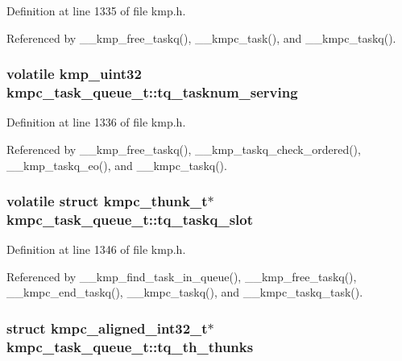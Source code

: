 Definition at line 1335 of file kmp.\-h.



Referenced by \-\_\-\-\_\-kmp\-\_\-free\-\_\-taskq(), \-\_\-\-\_\-kmpc\-\_\-task(), and \-\_\-\-\_\-kmpc\-\_\-taskq().

\hypertarget{structkmpc__task__queue__t_a628cd82e927fca521e942af89f006d59}{
\subsubsection[{tq\-\_\-tasknum\-\_\-serving}]{\setlength{\rightskip}{0pt plus 5cm}volatile kmp\-\_\-uint32 kmpc\-\_\-task\-\_\-queue\-\_\-t\-::tq\-\_\-tasknum\-\_\-serving}}\label{structkmpc__task__queue__t_a628cd82e927fca521e942af89f006d59}


Definition at line 1336 of file kmp.\-h.



Referenced by \-\_\-\-\_\-kmp\-\_\-free\-\_\-taskq(), \-\_\-\-\_\-kmp\-\_\-taskq\-\_\-check\-\_\-ordered(), \-\_\-\-\_\-kmp\-\_\-taskq\-\_\-eo(), and \-\_\-\-\_\-kmpc\-\_\-taskq().

\hypertarget{structkmpc__task__queue__t_a65ea724ea74e733bbae58fd1bb7511a6}{
\subsubsection[{tq\-\_\-taskq\-\_\-slot}]{\setlength{\rightskip}{0pt plus 5cm}volatile struct {\bf kmpc\-\_\-thunk\-\_\-t}$\ast$ kmpc\-\_\-task\-\_\-queue\-\_\-t\-::tq\-\_\-taskq\-\_\-slot}}\label{structkmpc__task__queue__t_a65ea724ea74e733bbae58fd1bb7511a6}


Definition at line 1346 of file kmp.\-h.



Referenced by \-\_\-\-\_\-kmp\-\_\-find\-\_\-task\-\_\-in\-\_\-queue(), \-\_\-\-\_\-kmp\-\_\-free\-\_\-taskq(), \-\_\-\-\_\-kmpc\-\_\-end\-\_\-taskq(), \-\_\-\-\_\-kmpc\-\_\-taskq(), and \-\_\-\-\_\-kmpc\-\_\-taskq\-\_\-task().

\hypertarget{structkmpc__task__queue__t_a71cbb7d720973aa2790fbafec688046a}{
\subsubsection[{tq\-\_\-th\-\_\-thunks}]{\setlength{\rightskip}{0pt plus 5cm}struct {\bf kmpc\-\_\-aligned\-\_\-int32\-\_\-t}$\ast$ kmpc\-\_\-task\-\_\-queue\-\_\-t\-::tq\-\_\-th\-\_\-thunks}}\label{structkmpc__task__queue__t_a71cbb7d720973aa2790fbafec688046a}


